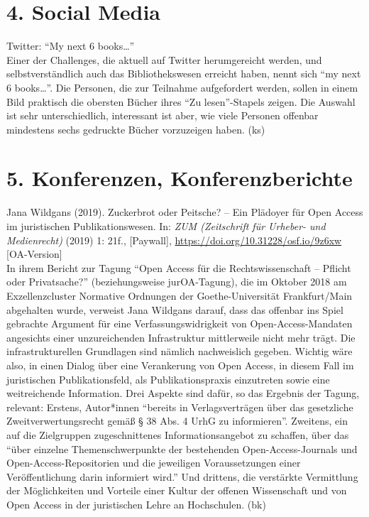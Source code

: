 \documentclass[a4paper,
fontsize=11pt,
oneside,
numbers=noperiodatend,
parskip=half-,
bibliography=totoc,
final
]{scrartcl}
\begin{document}
\hypertarget{social-media}{%
\section{4. Social Media}\label{social-media}}

Twitter: ``My next 6 books\ldots{}''\\
Einer der Challenges, die aktuell auf Twitter herumgereicht werden, und
selbstverständlich auch das Bibliothekswesen erreicht haben, nennt sich
``my next 6 books\ldots{}''. Die Personen, die zur Teilnahme
aufgefordert werden, sollen in einem Bild praktisch die obersten Bücher
ihres ``Zu lesen''-Stapels zeigen. Die Auswahl ist sehr unterschiedlich,
interessant ist aber, wie viele Personen offenbar mindestens sechs
gedruckte Bücher vorzuzeigen haben. (ks)

\hypertarget{konferenzen-konferenzberichte}{%
\section{5. Konferenzen,
Konferenzberichte}\label{konferenzen-konferenzberichte}}

Jana Wildgans (2019). Zuckerbrot oder Peitsche? -- Ein Plädoyer für Open
Access im juristischen Publikationswesen. In: \emph{ZUM (Zeitschrift für
Urheber- und Medienrecht)} (2019) 1: 21f., {[}Paywall{]},
\url{https://doi.org/10.31228/osf.io/9z6xw} {[}OA-Version{]}\\
In ihrem Bericht zur Tagung ``Open Access für die Rechtswissenschaft --
Pflicht oder Privatsache?'' (beziehungsweise jurOA-Tagung), die im
Oktober 2018 am Exzellenzcluster Normative Ordnungen der
Goethe-Universität Frankfurt/Main abgehalten wurde, verweist Jana
Wildgans darauf, dass das offenbar ins Spiel gebrachte Argument für eine
Verfassungswidrigkeit von Open-Access-Mandaten angesichts einer
unzureichenden Infrastruktur mittlerweile nicht mehr trägt. Die
infrastrukturellen Grundlagen sind nämlich nachweislich gegeben. Wichtig
wäre also, in einen Dialog über eine Verankerung von Open Access, in
diesem Fall im juristischen Publikationsfeld, als Publikationspraxis
einzutreten sowie eine weitreichende Information. Drei Aspekte sind
dafür, so das Ergebnis der Tagung, relevant: Erstens, Autor*innen
``bereits in Verlagsverträgen über das gesetzliche Zweitverwertungsrecht
gemäß § 38 Abs. 4 UrhG zu informieren''. Zweitens, ein auf die
Zielgruppen zugeschnittenes Informationsangebot zu schaffen, über das
``über einzelne Themenschwerpunkte der bestehenden Open-Access-Journals
und Open-Access-Repositorien und die jeweiligen Voraussetzungen einer
Veröffentlichung darin informiert wird.'' Und drittens, die verstärkte
Vermittlung der Möglichkeiten und Vorteile einer Kultur der offenen
Wissenschaft und von Open Access in der juristischen Lehre an
Hochschulen. (bk)
\end{document}
